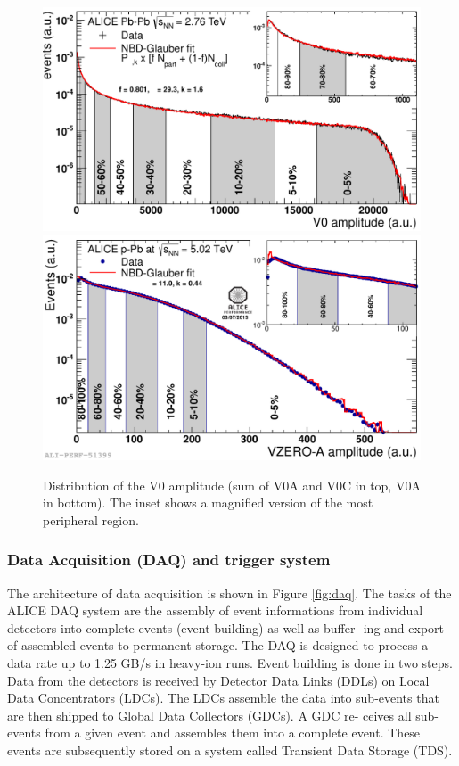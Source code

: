 \begin{figure}[htbp]
\begin{center}
\includegraphics[width=12.cm]{./Version1/FigChapter4/CentralityPbPb}
\hspace{1.0cm}
\includegraphics[width=12.cm]{./Version1/FigChapter4/CentralitypPb}
\caption{Distribution of the V0 amplitude (sum of V0A and V0C in top, V0A in bottom). The inset shows a magnified version of the most peripheral region.}
\label{fig:centralityestimate}
\end{center}
\end{figure}

\newpage
\subsubsection{Data Acquisition (DAQ) and trigger system}\label{label:aliceDAQ}
The architecture of data acquisition is shown in Figure \ref{fig:daq}. The tasks of the ALICE DAQ system are the assembly of event informations from individual detectors into complete events (event building) as well as buffer- ing and export of assembled events to permanent storage. The DAQ is designed to process a data rate up to 1.25 GB/s in heavy-ion runs. Event building is done in two steps. Data from the detectors is received by Detector Data Links (DDLs) on Local Data Concentrators (LDCs). The LDCs assemble the data into sub-events that are then shipped to Global Data Collectors (GDCs). A GDC re- ceives all sub-events from a given event and assembles them into a complete event. These events are subsequently stored on a system called Transient Data Storage (TDS).

